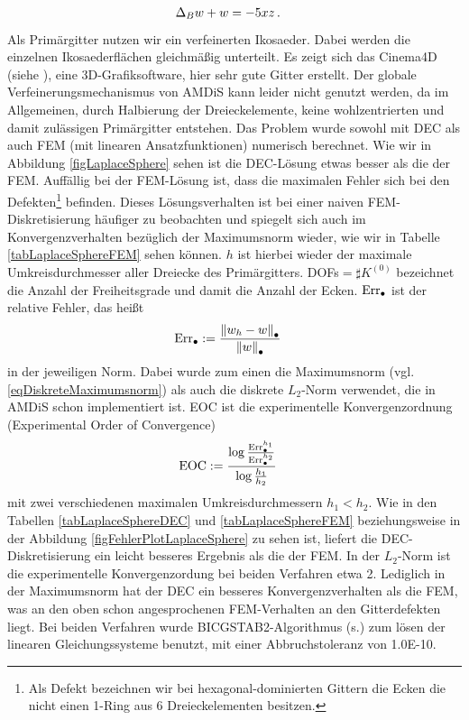 \begin{beispiel}[Einheitssphäre]
\begin{align}
          \label{eqLaplaceSphereProblemUmform}
         \Delta_{B} w + w &= -5 x z \,\text{.}
       \end{align}
       Als Primärgitter nutzen wir ein verfeinerten Ikosaeder.
       Dabei werden die einzelnen Ikosaederflächen gleichmäßig unterteilt.
       Es zeigt sich das Cinema4D (siehe \cite{cinema4d}), eine 3D-Grafiksoftware, hier sehr gute Gitter erstellt.
       Der globale Verfeinerungsmechanismus von AMDiS kann leider nicht genutzt werden, da im Allgemeinen,
       durch Halbierung der Dreieckelemente, keine wohlzentrierten und damit zulässigen Primärgitter entstehen.
       Das Problem wurde sowohl mit DEC als auch FEM (mit linearen Ansatzfunktionen) 
       numerisch berechnet.
       Wie wir in Abbildung \ref{figLaplaceSphere} sehen ist die DEC-Lösung etwas besser als die der FEM.
       Auffällig bei der FEM-Lösung ist, dass die maximalen Fehler sich bei den Defekten\footnote{Als Defekt bezeichnen wir bei
       hexagonal-dominierten Gittern die Ecken die nicht einen 1-Ring aus 6 Dreieckelementen besitzen.} 
       befinden.
       Dieses Lösungsverhalten ist bei einer naiven FEM-Diskretisierung häufiger zu beobachten und spiegelt sich auch im
       Konvergenzverhalten bezüglich der Maximumsnorm wieder, wie wir in Tabelle \ref{tabLaplaceSphereFEM} sehen können.
       \( h \) ist hierbei wieder der maximale Umkreisdurchmesser aller Dreiecke des Primärgitters.
       DOFs\( = \sharp K^{(0)} \) bezeichnet die Anzahl der Freiheitsgrade und damit die Anzahl der Ecken.
       \( \text{Err}_{\bullet} \) ist der relative Fehler, das heißt
       \begin{align}
         \text{Err}_{\bullet} &:= \frac{\left\| w_{h} - w \right\|_{\bullet}}{\left\| w \right\|_{\bullet}}
       \end{align}
       in der jeweiligen Norm.
       Dabei wurde zum einen die Maximumsnorm (vgl. \ref{eqDiskreteMaximumsnorm}) als auch die diskrete \(
       L_{2} \)-Norm verwendet,
       die in AMDiS schon implementiert ist.
       EOC ist die experimentelle Konvergenzordnung (Experimental Order of Convergence)
       \begin{align}
         \text{EOC} &:= \frac{\log\frac{\text{Err}_{\bullet}^{h_{1}}}{\text{Err}_{\bullet}^{h_{2}}}}
                             {\log\frac{h_{1}}{h_{2}}}
       \end{align}
       mit zwei verschiedenen maximalen Umkreisdurchmessern \( h_{1} < h_{2} \).
       Wie in den Tabellen \ref{tabLaplaceSphereDEC} und \ref{tabLaplaceSphereFEM} beziehungsweise in der
       Abbildung \ref{figFehlerPlotLaplaceSphere} zu sehen ist, liefert die DEC-Diskretisierung ein leicht
       besseres Ergebnis als die der FEM.
       In der \( L_{2} \)-Norm ist die experimentelle Konvergenzordung bei beiden Verfahren etwa 2.
       Lediglich in der Maximumsnorm hat der DEC ein besseres Konvergenzverhalten als die FEM, 
       was an den oben schon
       angesprochenen FEM-Verhalten an den Gitterdefekten liegt.
       Bei beiden Verfahren wurde BICGSTAB2-Algorithmus (s.\cite{bicgstab2}) zum lösen der linearen
       Gleichungssysteme benutzt, mit einer Abbruchstoleranz von 1.0E-10.


\end{beispiel}
